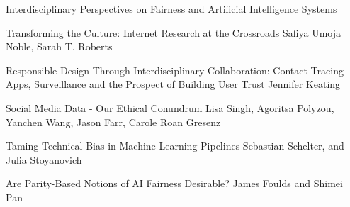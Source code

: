 \documentclass[11pt]{article}
\begin{document}
\begin{bulletin}
\begin{articlesection}{Interdisciplinary Perspectives on Fairness and Artificial Intelligence Systems}
%
%


\begin{article}
{Transforming the Culture: Internet Research at the Crossroads}
{Safiya Umoja Noble, Sarah T. Roberts}
\graphicspath{{submissions/NobleRoberts_final/}}

\end{article}

%
\begin{article}
{Responsible Design Through Interdisciplinary Collaboration: Contact Tracing Apps, Surveillance and the Prospect of Building User Trust}
{Jennifer Keating}
\graphicspath{{submissions/Keating_final/}}

\end{article}
%
%
\begin{article}
{Social Media Data - Our Ethical Conundrum}
{Lisa Singh, Agoritsa Polyzou, Yanchen Wang, Jason Farr, Carole Roan Gresenz}
\graphicspath{{submissions/Singh_final/figs}}

\end{article}
%
%
\begin{article}
{Taming Technical Bias in Machine Learning Pipelines}
{Sebastian Schelter, and Julia Stoyanovich}
\graphicspath{{submissions/SchelterStoyanovich_final/}}

\end{article}
%
%
\begin{article}
{Are Parity-Based Notions of AI Fairness Desirable?}
{James Foulds and Shimei Pan}
\graphicspath{{submissions/foulds_pan_final/}}

\end{article}


\end{articlesection}
\end{bulletin}
\end{document}
